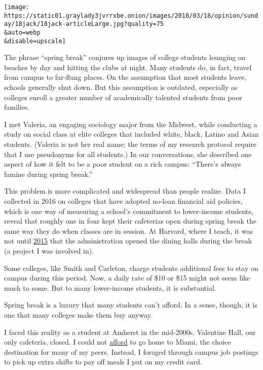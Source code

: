 \texttt{[image: https://static01.graylady3jvrrxbe.onion/images/2018/03/18/opinion/sunday/18jack/18jack-articleLarge.jpg?quality=75\\\&auto=webp\\\&disable=upscale]}

The phrase ``spring break'' conjures up images of college students
lounging on beaches by day and hitting the clubs at night. Many students
do, in fact, travel from campus to far-flung places. On the assumption
that most students leave, schools generally shut down. But this
assumption is outdated, especially as colleges enroll a greater number
of academically talented students from poor families.

I met Valeria, an engaging sociology major from the Midwest, while
conducting a study on social class at elite colleges that included
white, black, Latino and Asian students. (Valeria is not her real name;
the terms of my research protocol require that I use pseudonyms for all
students.) In our conversations, she described one aspect of how it felt
to be a poor student on a rich campus: ``There's always famine during
spring break.''

This problem is more complicated and widespread than people realize.
Data I collected in 2016 on colleges that have adopted no-loan financial
aid policies, which is one way of measuring a school's commitment to
lower-income students, reveal that roughly one in four kept their
cafeterias open during spring break the same way they do when classes
are in session. At Harvard, where I teach, it was not until
\href{https://www.nytimes3xbfgragh.onion/2015/04/12/education/edlife/first-generation-students-unite.html}{2015}
that the administration opened the dining halls during the break (a
project I was involved in).

Some colleges, like Smith and Carleton, charge students additional fees
to stay on campus during this period. Now, a daily rate of \$10 or \$15
might not seem like much to some. But to many lower-income students, it
is substantial.

Spring break is a luxury that many students can't afford. In a sense,
though, it is one that many colleges make them buy anyway.

I faced this reality as a student at Amherst in the mid-2000s. Valentine
Hall, our only cafeteria, closed. I could not
\href{http://www.nytimes3xbfgragh.onion/2007/05/27/education/27grad.html}{afford}
to go home to Miami, the choice destination for many of my peers.
Instead, I foraged through campus job postings to pick up extra shifts
to pay off meals I put on my credit card.

